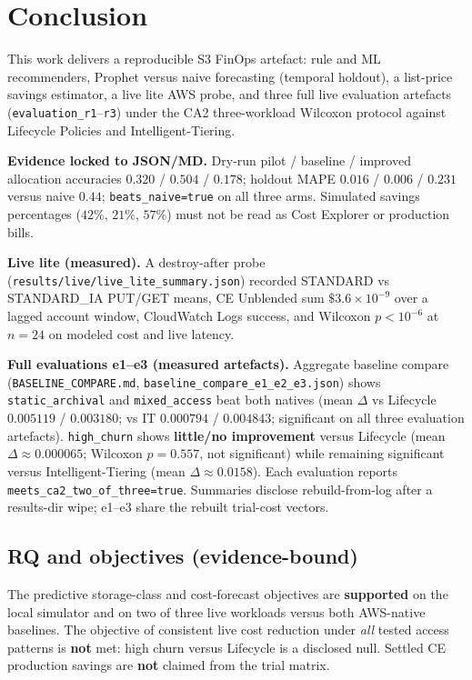 \chapter{Conclusion}
This work delivers a reproducible S3 FinOps artefact: rule and ML recommenders, Prophet versus naive forecasting (temporal holdout), a list-price savings estimator, a live lite AWS probe, and three full live evaluation artefacts (\texttt{evaluation\_r1}--\texttt{r3}) under the CA2 three-workload Wilcoxon protocol against Lifecycle Policies and Intelligent-Tiering.

\textbf{Evidence locked to JSON/MD.} Dry-run pilot / baseline / improved allocation accuracies $0.320$ / $0.504$ / $0.178$; holdout MAPE $0.016$ / $0.006$ / $0.231$ versus naive $0.44$; \texttt{beats\_naive=true} on all three arms. Simulated savings percentages ($42\%$, $21\%$, $57\%$) must not be read as Cost Explorer or production bills.

\textbf{Live lite (measured).} A destroy-after probe (\texttt{results/live/live\_lite\_summary.json}) recorded STANDARD vs STANDARD\_IA PUT/GET means, CE Unblended sum $\$3.6\times10^{-9}$ over a lagged account window, CloudWatch Logs success, and Wilcoxon $p{<}10^{-6}$ at $n{=}24$ on modeled cost and live latency.

\textbf{Full evaluations e1--e3 (measured artefacts).}
 Aggregate baseline compare
(\texttt{BASELINE\_COMPARE.md}, \texttt{baseline\_compare\_e1\_e2\_e3.json}) shows
\texttt{static\_archival} and \texttt{mixed\_access} beat both natives
(mean $\Delta$ vs Lifecycle $0.005119$ / $0.003180$; vs IT $0.000794$ / $0.004843$;
significant on all three evaluation artefacts). \texttt{high\_churn} shows
\textbf{little/no improvement} versus Lifecycle (mean $\Delta{\approx}0.000065$;
Wilcoxon $p{=}0.557$, not significant) while remaining significant versus Intelligent-Tiering
(mean $\Delta{\approx}0.0158$). Each evaluation reports
\texttt{meets\_ca2\_two\_of\_three=true}. Summaries disclose rebuild-from-log after a
results-dir wipe; e1--e3 share the rebuilt trial-cost vectors.

\section{RQ and objectives (evidence-bound)}

The predictive storage-class and cost-forecast objectives are \textbf{supported} on the
local simulator and on two of three live workloads versus both AWS-native baselines.
The objective of consistent live cost reduction under \emph{all} tested access patterns is
\textbf{not} met: high churn versus Lifecycle is a disclosed null. Settled CE production
savings are \textbf{not} claimed from the trial matrix.

